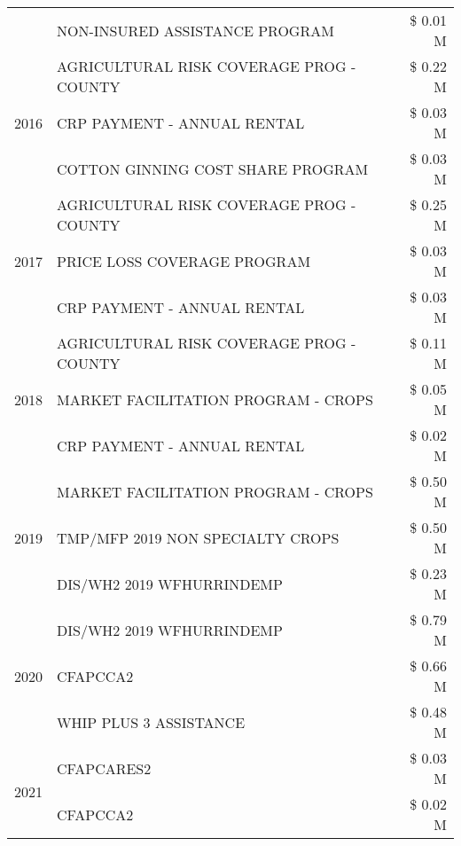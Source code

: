 \begin{tabular}{llr}
 & NON-INSURED ASSISTANCE PROGRAM & \$ 0.01 M \\
\cline{1-3}
\multirow[t]{3}{*}{2016} & AGRICULTURAL RISK COVERAGE PROG - COUNTY & \$ 0.22 M \\
 & CRP PAYMENT - ANNUAL RENTAL & \$ 0.03 M \\
 & COTTON GINNING COST SHARE PROGRAM & \$ 0.03 M \\
\cline{1-3}
\multirow[t]{3}{*}{2017} & AGRICULTURAL RISK COVERAGE PROG - COUNTY & \$ 0.25 M \\
 & PRICE LOSS COVERAGE PROGRAM & \$ 0.03 M \\
 & CRP PAYMENT - ANNUAL RENTAL & \$ 0.03 M \\
\cline{1-3}
\multirow[t]{3}{*}{2018} & AGRICULTURAL RISK COVERAGE PROG - COUNTY & \$ 0.11 M \\
 & MARKET FACILITATION PROGRAM - CROPS & \$ 0.05 M \\
 & CRP PAYMENT - ANNUAL RENTAL & \$ 0.02 M \\
\cline{1-3}
\multirow[t]{3}{*}{2019} & MARKET FACILITATION PROGRAM - CROPS & \$ 0.50 M \\
 & TMP/MFP 2019 NON SPECIALTY CROPS & \$ 0.50 M \\
 & DIS/WH2 2019 WFHURRINDEMP & \$ 0.23 M \\
\cline{1-3}
\multirow[t]{3}{*}{2020} & DIS/WH2 2019 WFHURRINDEMP & \$ 0.79 M \\
 & CFAPCCA2 & \$ 0.66 M \\
 & WHIP PLUS 3 ASSISTANCE & \$ 0.48 M \\
\cline{1-3}
\multirow[t]{2}{*}{2021} & CFAPCARES2 & \$ 0.03 M \\
 & CFAPCCA2 & \$ 0.02 M \\
\cline{1-3}
\bottomrule
\end{tabular}
